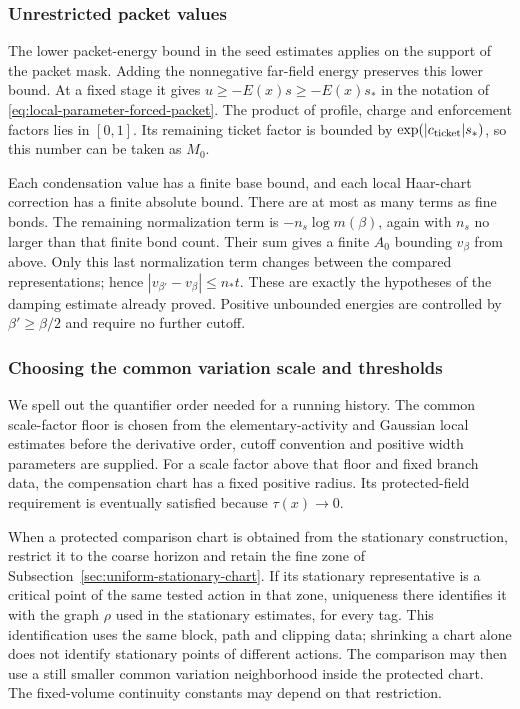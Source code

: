 \subsubsection{Unrestricted packet values}
The lower packet-energy bound in the seed estimates applies on the
support of the packet mask. Adding the nonnegative far-field energy
preserves this lower bound. At a fixed stage it gives
$u\ge-E(x)s\ge-E(x)s_*$ in the notation of
\eqref{eq:local-parameter-forced-packet}. The product of profile,
charge and enforcement factors lies in $[0,1]$. Its remaining ticket
factor is bounded by $\exp(|c_{\rm ticket}|s_*)$, so this number can
be taken as $M_0$.

Each condensation value has a finite base bound, and each local
Haar-chart correction has a finite absolute bound. There are at most
as many terms as fine bonds. The remaining normalization term is
$-n_s\log m(\beta)$, again with $n_s$ no larger than that finite bond
count. Their sum gives a finite $A_0$ bounding $v_\beta$ from above.
Only this last normalization term changes between the compared
representations; hence
$|v_{\beta'}-v_\beta|\le n_*t$. These are exactly the hypotheses of
the damping estimate already proved. Positive unbounded energies
are controlled by $\beta'\ge\beta/2$ and require no further cutoff.

\subsubsection{Choosing the common variation scale and thresholds}
We spell out the quantifier order needed for a running history.
The common scale-factor floor is chosen from the elementary-activity
and Gaussian local estimates before the derivative order, cutoff
convention and positive width parameters are supplied. For a scale
factor above that floor and fixed branch data, the compensation
chart has a fixed positive radius. Its protected-field requirement
is eventually satisfied because $\tau(x)\to0$.

When a protected comparison chart is obtained from the stationary
construction, restrict it to the coarse horizon and retain the fine
zone of Subsection~\ref{sec:uniform-stationary-chart}. If its stationary
representative is a critical point of the same tested action in that
zone, uniqueness there identifies it with the graph $\rho$ used in
the stationary estimates, for every tag. This identification uses
the same block, path and clipping data; shrinking a chart alone does
not identify stationary points of different actions. The comparison
may then use a still smaller common variation neighborhood inside
the protected chart. The fixed-volume continuity constants may depend
on that restriction.

